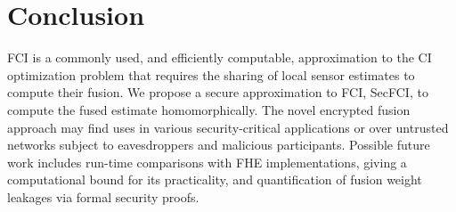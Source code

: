 \documentclass[letterpaper, 10 pt, conference]{ieeeconf}  %
\begin{document}



\section{Conclusion} \label{sec:conclusion}
FCI is a commonly used, and efficiently computable, approximation to the CI optimization problem that requires the sharing of local sensor estimates to compute their fusion. We propose a secure approximation to FCI, SecFCI, to compute the fused estimate homomorphically. The novel encrypted fusion approach may find uses in various security-critical applications or over untrusted networks subject to eavesdroppers and malicious participants. Possible future work includes run-time comparisons with FHE implementations, giving a computational bound for its practicality, and quantification of fusion weight leakages via formal security proofs.



\end{document}
